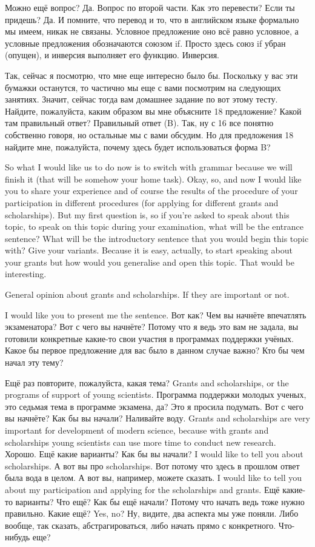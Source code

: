 \documentclass[main.tex]{subfiles}
\begin{document}
Можно ещё вопрос?
Да.
Вопрос по второй части. Как это перевести?
Если ты придешь?
Да.
И помните, что перевод и то, что в английском языке формально мы имеем, никак не связаны.
Условное предложение оно всё равно условное, а условные предложения обозначаются союзом if.
Просто здесь союз if убран (опущен), и инверсия выполняет его функцию.
Инверсия.

Так, сейчас я посмотрю, что мне еще интересно было бы.
Поскольку у вас эти бумажки останутся, то частично мы еще с вами посмотрим на следующих занятиях.
Значит, сейчас тогда вам домашнее задание по вот этому тесту.
Найдите, пожалуйста, каким образом вы мне объясните 18 предложение?
Какой там правильный ответ?
Правильный ответ (B).
Так, ну с 16 все понятно собственно говоря, но остальные мы с вами обсудим.
Но для предложения 18 найдите мне, пожалуйста, почему здесь будет использоваться форма B?

\newpage
{}

So what I would like us to do now is to switch with grammar because we will finish it (that will be somehow your home task).
Okay, so, and now I would like you to share your experience and of course the results of the procedure of your participation in different procedures (for applying for different grants and scholarships).
But my first question is, so if you're asked to speak about this topic, to speak on this topic during your examination, what will be the entrance sentence?
What will be the introductory sentence that you would begin this topic with?
Give your variants.
Because it is easy, actually, to start speaking about your grants but how would you generalise and open this topic.
That would be interesting.

General opinion about grants and scholarships.
If they are important or not.

I would like you to present me the sentence.
Вот как?
Чем вы начнёте впечатлять экзаменатора?
Вот с чего вы начнёте?
Потому что я ведь это вам не задала, вы готовили конкретные какие-то свои участия в программах поддержки учёных.
Какое бы первое предложение для вас было в данном случае важно?
Кто бы чем начал эту тему?

Ещё раз повторите, пожалуйста, какая тема?
Grants and scholarships, or the programs of support of young scientists.
Программа поддержки молодых ученых, это седьмая тема в программе экзамена, да?
Это я просила подумать.
Вот с чего вы начнёте?
Как бы вы начали?
Наливайте воду.
Grants and scholarships are very important for development of modern science, because with grants and scholarships young scientists can use more time to conduct new research.
Хорошо.
Ещё какие варианты?
Как бы вы начали?
I would like to tell you about scholarships.
А вот вы про scholarships.
Вот потому что здесь в прошлом ответ была вода в целом.
А вот вы, например, можете сказать.
I would like to tell you about my participation and applying for the scholarships and grants.
Ещё какие-то варианты?
Что ещё?
Как бы ещё начали?
Потому что начать ведь тоже нужно правильно.
Какие ещё?
Yes, no? Ну, видите, два аспекта мы уже поняли.
Либо вообще, так сказать, абстрагироваться, либо начать прямо с конкретного.
Что-нибудь еще?
\end{document}
